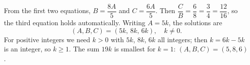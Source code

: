 From the first two equations, $B=\dfrac{8A}{5}$ and $C=\dfrac{6A}{5}$. Then $\dfrac CB=\dfrac68=\dfrac34=\dfrac{12}{16}$, so the third equation holds automatically. Writing $A=5k$, the solutions are
\[\boxed{(A,B,C)=(5k,\,8k,\,6k),\quad k\ne0}.\]
For positive integers we need $k>0$ with $5k$, $8k$, $6k$ all integers; then $k=6k-5k$ is an integer, so $k\ge1$. The sum $19k$ is smallest for $k=1$: $(A,B,C)=\boxed{(5,8,6)}$.

